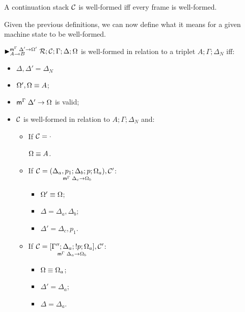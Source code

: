 \begin{definition}
A continuation stack $\lstack{C}$ is well-formed iff every frame is well-formed.
\end{definition}

Given the previous definitions, we can now define what it means for a given
machine state to be well-formed.

\begin{definition}

$\matstate{A \lolli B}{\rulestk}{\lstack{C}}{\Gamma}{\Delta}{\Omega}{\Delta'
\rightarrow \Omega'}$ is well-formed in relation to a triplet $A; \Gamma;
\Delta_{N}$ iff:

\begin{itemize}[leftmargin=*]
   \item $\Delta, \Delta' = \Delta_{N}$
   \item $\feq{\Omega', \Omega}{A}$;
   \item $\mz{\Gamma}{\Delta'}{\Omega}$ is valid;
   \item $\lstack{C}$ is well-formed in relation to $A; \Gamma; \Delta_{N}$ and:
   \begin{itemize}[leftmargin=\secondm]
      \item If $\lstack{C} = \cdot$
   
      $\feq{\Omega}{A}$.
   
      \item If $\lstack{C} = \lframe{\Delta_a,
   p_1}{\Delta_b}{p}{\Omega_a}{\Delta_c}{\Omega_b}, \lstack{C'}$:
      \begin{itemize}[leftmargin=\thirdm]
         \item $\feq{\Omega'}{\Omega}$;
         \item $\Delta = \Delta_a, \Delta_b$;
         \item $\Delta' = \Delta_c, p_1$.
      \end{itemize}

      \item If $\lstack{C} = \pframe{\Gamma''}{\Delta_a}{\bang
         p}{\Omega_a}{\Delta_a}{\Omega_b}, \lstack{C'}$:
      \begin{itemize}[leftmargin=\thirdm]
         \item $\feq{\Omega}{\Omega_a}$;
         \item $\Delta' = \Delta_a$;
         \item $\Delta = \Delta_a$.
      \end{itemize}
   \end{itemize}
\end{itemize}

\end{definition}

